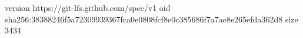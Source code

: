 version https://git-lfs.github.com/spec/v1
oid sha256:38388246f5a72309939367fca0e0808fcf8e0c385686f7a7ae8e265efda362d8
size 3434

